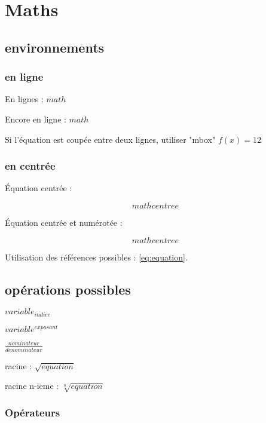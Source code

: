 

\section{Maths}

\subsection{environnements}

\subsubsection{en ligne}

En lignes : $math$

Encore en ligne : 
\begin{math}
	math
\end{math}


Si l'équation est coupée entre deux lignes, utiliser "mbox" \mbox{$f(x)=12$}


\subsubsection{en centrée}

Équation centrée : 

\begin{displaymath}
	math centree
\end{displaymath}


Équation centrée et numérotée :

\begin{equation}
	\label{eq:equation}
	math centree
\end{equation}


Utilisation des références possibles : \ref{eq:equation}.


\subsection{opérations possibles}

$variable_{indice}$

$variable^{exposant}$

$\frac{nominateur}{denominateur}$

racine : $\sqrt{equation}$

racine n-ieme : $\sqrt[n]{equation}$

\subsubsection{Opérateurs}


